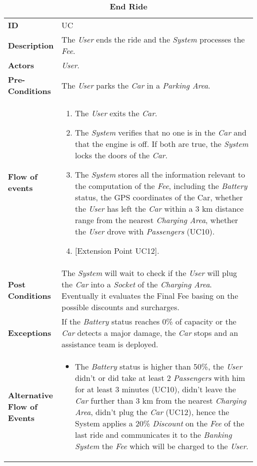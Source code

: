 \begin{longtable}{|p{0.2\linewidth} | p{0.8\linewidth}|}
	\captionsetup{labelformat=empty} %
	\caption{\textbf{End Ride}} %
	\label{UC_EndRide}%
	\\ \hline %
	
	\textbf{ID} & UC\theUseCaseIdCounter \\ \hline
	\textbf{Description} & The \emph{User} ends the ride and the \emph{System} processes the \emph{Fee}. \\ \hline
	\textbf{Actors} & \emph{User}.\\ \hline
	\textbf{Pre-Conditions} & The \emph{User} parks the \emph{Car} in a \emph{Parking Area}. \\ \hline
	\textbf{Flow of events} & 
	\begin{enumerate}
		\item The \emph{User} exits the \emph{Car}.
		\item The \emph{System} verifies that no one is in the \emph{Car} and that the engine is off. If both are true, the \emph{System} locks the doors of the \emph{Car}.
		\item The \emph{System} stores all the information relevant to the computation of the \emph{Fee}, including the \emph{Battery} status, the GPS coordinates of the Car, whether the \emph{User} has left the \emph{Car} within a 3 km distance range from the nearest \emph{Charging Area}, whether the \emph{User} drove with \emph{Passengers} (UC10). 
		\item {[}Extension Point UC12{]}.
	\end{enumerate}	 \\ \hline
	\textbf{Post Conditions} & The \emph{System} will wait to check if the \emph{User} will plug the \emph{Car} into a \emph{Socket} of the \emph{Charging Area}. Eventually it evaluates the Final Fee basing on the possible discounts and surcharges. \\ \hline
	\textbf{Exceptions} & If the \emph{Battery} status reaches 0\% of capacity or the \emph{Car} detects a major damage, the \emph{Car} stops and an assistance team is deployed. \\ \hline
	\textbf{Alternative Flow of Events} &
	\begin{itemize}
		\item The \emph{Battery} status is higher than 50\%, the \emph{User} didn't or did take at least 2 \emph{Passengers} with him for at least 3 minutes (UC10), didn't leave the \emph{Car} further than 3 km from the nearest \emph{Charging Area}, didn't plug the \emph{Car} (UC12), hence the System applies a 20\% \emph{Discount} on the \emph{Fee} of the last ride and communicates it to the \emph{Banking System} the \emph{Fee} which will be charged to the \emph{User}.

\end{itemize}
\end{longtable}
